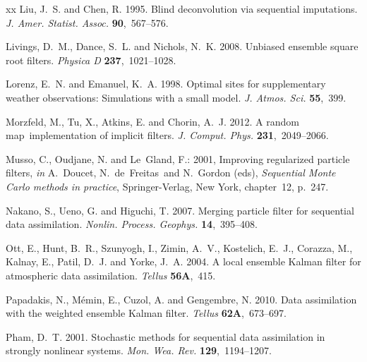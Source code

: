\documentclass[useAMS,usenatbib]{tellus}
\begin{document}
\begin{thebibliography}{xx}
Liu, J.~S. and Chen, R. 1995. {Blind deconvolution via sequential imputations}.
  {\em {J. Amer. Statist. Assoc.}} {\bf 90},~567--576.

Livings, D.~M., Dance, S.~L. and Nichols, N.~K. 2008. {Unbiased ensemble square
  root filters}. {\em {Physica D}} {\bf 237},~1021--1028.

Lorenz, E.~N. and Emanuel, K.~A. 1998. {Optimal sites for supplementary weather
  observations: Simulations with a small model}. {\em {J. Atmos. Sci.}} {\bf
  55},~399.

Morzfeld, M., Tu, X., Atkins, E. and Chorin, A.~J. 2012. {A random map~implementation of implicit filters}. {\em {J. Comput. Phys.}} {\bf
  231},~2049--2066.

Musso, C., Oudjane, N. and Le~Gland, F.: 2001, {Improving regularized particle
  filters}, {\em in} A.~Doucet, \pagebreak N.~de~Freitas~and N.~Gordon (eds), {\em
  {Sequential Monte Carlo methods in practice}}, {Springer-Verlag, New York},
  chapter~12, p.~247.

Nakano, S., Ueno, G. and Higuchi, T. 2007. {Merging particle filter for
  sequential data assimilation}. {\em {Nonlin. Process. Geophys.}} {\bf
  14},~395--408.

Ott, E., Hunt, B.~R., Szunyogh, I., Zimin, A.~V., Kostelich, E.~J., Corazza,
  M., Kalnay, E., Patil, D.~J. and Yorke, J.~A. 2004. {A local ensemble Kalman
  filter for atmospheric data assimilation}. {\em {Tellus}} {\bf 56A},~415.

Papadakis, N., M{\'e}min, E., Cuzol, A. and Gengembre, N. 2010. {Data
  assimilation with the weighted ensemble Kalman filter}. {\em {Tellus}} {\bf
  62A},~673--697.

Pham, D.~T. 2001. {Stochastic methods for sequential data assimilation in
  strongly nonlinear systems}. {\em Mon. Wea. Rev.} {\bf 129},~1194--1207.


\end{thebibliography}
\end{document}
